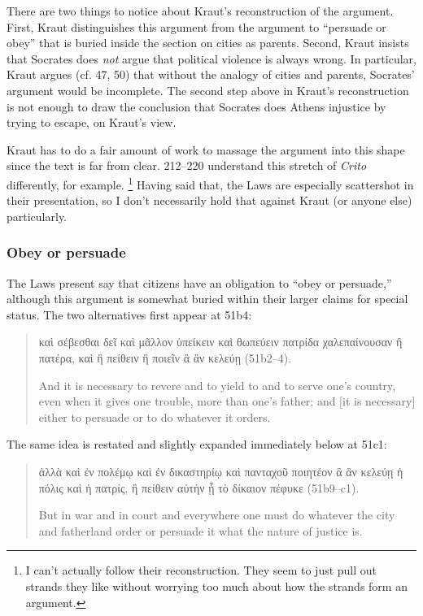 \documentclass[12pt,letterpaper]{article}
\begin{document}
There are two things to notice about Kraut's reconstruction of the argument.
First, Kraut distinguishes this argument from the argument to ``persuade or obey'' that is buried inside the section on cities as parents.
Second, Kraut insists that Socrates does \emph{not} argue that political violence is always wrong.
In particular, Kraut argues (cf. 47, 50) that without the analogy of cities and parents, Socrates' argument would be incomplete.
The second step above in Kraut's reconstruction is not enough to draw the conclusion that Socrates does Athens injustice by trying to escape, on Kraut's view.

Kraut has to do a fair amount of work to massage the argument into this shape since the text is far from clear.%
\cite{brickhouse-smith2004-plato-trial-of-socrates} 212--220 understand this stretch of \textit{Crito} differently, for example.%
\footnote{I can't actually follow their reconstruction.
They seem to just pull out strands they like without worrying too much about how the strands form an argument.}
Having said that, the Laws are especially scattershot in their presentation, so I don't necessarily hold that against Kraut (or anyone else) particularly.

\subsubsection*{Obey or persuade}

The Laws present say that citizens have an obligation to ``obey or persuade,'' although this argument is somewhat buried within their larger claims for special status.
The two alternatives first appear at 51b4:

\begin{quote}

    \textgreek{καὶ σέβεσθαι δεῖ καὶ μᾶλλον ὑπείκειν καὶ θωπεύειν πατρίδα χαλεπαίνουσαν ἢ πατέρα, καὶ ἢ πείθειν ἢ ποιεῖν ἃ ἂν κελεύῃ} (51b2--4).

    And it is necessary to revere and to yield to and to serve one's country, even when it gives one trouble, more than one's father; and [it is necessary] either to persuade or to do whatever it orders.

\end{quote}

The same idea is restated and slightly expanded immediately below at 51c1:

\begin{quote}

    \textgreek{ἀλλὰ καὶ ἐν πολέμῳ καὶ ἐν δικαστηρίῳ καὶ πανταχοῦ ποιητέον ἃ ἂν κελεύῃ ἡ πόλις καὶ ἡ πατρίς, ἢ πείθειν αὐτὴν ᾗ τὸ δίκαιον πέφυκε} (51b9--c1).

    But in war and in court and everywhere one must do whatever the city and fatherland order or persuade it what the nature of justice is.

\end{quote}
\end{document}
